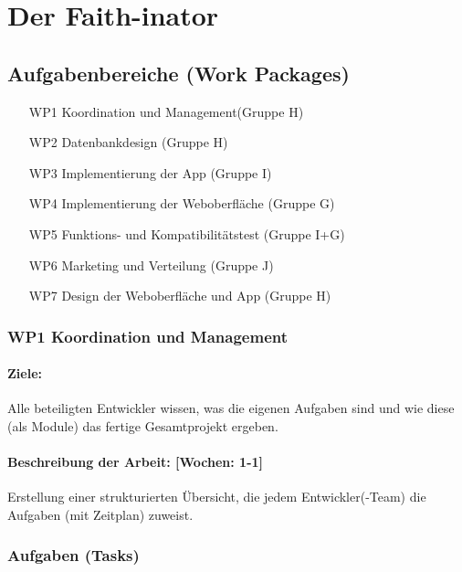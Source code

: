 \documentclass{scrreprt}
\begin{document}
\chapter{Der Faith-inator}


\section*{Aufgabenbereiche (Work Packages)}

\begin{enumerate}
\item [WP1] Koordination und Management(Gruppe H)
\item [WP2] Datenbankdesign (Gruppe H)
\item [WP3] Implementierung der App (Gruppe I)
\item [WP4] Implementierung der Weboberfläche (Gruppe G)
\item [WP5] Funktions- und Kompatibilitätstest (Gruppe I+G)
\item [WP6] Marketing und Verteilung (Gruppe J)
\item [WP7] Design der Weboberfläche und App (Gruppe H)
\end{enumerate}


\subsection*{WP1 Koordination und Management}

\subsubsection{Ziele:} Alle beteiligten Entwickler wissen, was die eigenen Aufgaben sind und wie diese (als Module) das fertige Gesamtprojekt ergeben.
\subsubsection{Beschreibung der Arbeit: [Wochen: 1-1]} Erstellung einer strukturierten Übersicht, die jedem Entwickler(-Team) die Aufgaben (mit Zeitplan) zuweist.

\subsection*{Aufgaben (Tasks)}
\end{document}
